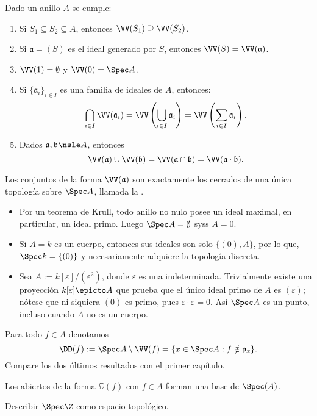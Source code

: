 \begin{lem}
	Dado un anillo $A$ se cumple:
	\begin{enumerate}
		\item Si $S_1 \subseteq S_2 \subseteq A$, entonces $\VV(S_1) \supseteq \VV(S_2)$.
		\item Si $\mathfrak{a} = (S)$ es el ideal generado por $S$, entonces $\VV(S) = \VV(\mathfrak{a})$.
		\item $\VV(1) = \emptyset$ y $\VV(0) = \Spec A$.
		\item Si $\{ \mathfrak{a}_i \}_{i\in I}$ es una familia de ideales de $A$, entonces:
			$$ \bigcap_{i\in I} \VV(\mathfrak{a}_i) = \VV\left( \bigcup_{i\in I} \mathfrak{a}_i \right)
			= \VV\left( \sum_{i\in I} \mathfrak{a}_i \right). $$
		\item Dados $\mathfrak{a, b} \nsle A$, entonces
			$$ \VV(\mathfrak{a}) \cup \VV(\mathfrak{b}) = \VV(\mathfrak{a \cap b}) = \VV(\mathfrak{a \cdot b}). $$
	\end{enumerate}
\end{lem}

\begin{mydef}
	Los conjuntos de la forma $\VV(\mathfrak{a})$ son exactamente los cerrados de una única topología sobre $\Spec A$,
	llamada la .
\end{mydef}
\begin{ex}
	\begin{itemize}
		\item Por un teorema de Krull, todo anillo no nulo posee un ideal maximal, en particular, un ideal primo.
			Luego $\Spec A = \emptyset$ syss $A = 0$.
		\item Si $A = k$ es un cuerpo, entonces sus ideales son solo $\{ (0), A \}$, por lo que, $\Spec k = \{ (0) \}$ y
			necesariamente adquiere la topología discreta.
		\item Sea $A := k[\varepsilon]/(\varepsilon^2)$, donde $\varepsilon$ es una indeterminada.
			Trivialmente existe una proyección $k[\varepsilon] \epicto A$ que prueba que el único ideal primo de $A$ es
			$(\varepsilon)$; nótese que ni siquiera $(0)$ es primo, pues $\varepsilon \cdot \varepsilon = 0$.
			Así $\Spec A$ es un punto, incluso cuando $A$ no es un cuerpo.
	\end{itemize}
\end{ex}

Para todo $f \in A$ denotamos
$$ \DD(f) := \Spec A \setminus \VV(f) = \{ x \in \Spec A : f \notin \mathfrak{p}_x \}. $$
Compare los dos últimos resultados con el primer capítulo.
\begin{prop}
	Los abiertos de la forma $\DD(f)$ con $f \in A$ forman una base de $\Spec(A)$.
\end{prop}
\begin{prob}
	Describir $\Spec\Z$ como espacio topológico.
\end{prob}

